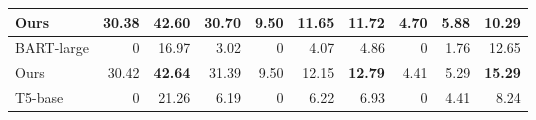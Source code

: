 \begin{table*}[ht]
{\begin{tabular}{lrrrrrrrrr}
    Ours       & 30.38                                                                  & \textbf{42.60}                                                   & 30.70                                                               & 9.50                                                                   & 11.65                                                            & \textbf{11.72}                                                      & 4.70                                                                   & 5.88                                                             & \textbf{10.29}                                                      \\ \hline
    BART-large             & 0                                                                      & 16.97                                                            & 3.02                                                                & 0                                                                      & 4.07                                                             & 4.86                                                                & 0                                                                      & 1.76                                                             & 12.65                                                               \\ 
    Ours      & 30.42                                                                  & \textbf{42.64}                                                   & 31.39                                                               & 9.50                                                                   & 12.15                                                            & \textbf{12.79}                                                      & 4.41                                                                   & 5.29                                                             & \textbf{15.29}                                                      \\ \hline
    T5-base                & 0                                                                      & 21.26                                                            & 6.19                                                                & 0                                                                      & 6.22                                                             & 6.93                                                                & 0                                                                      & 4.41                                                             & 8.24                                                                \\

\end{tabular}}
\end{table*}
